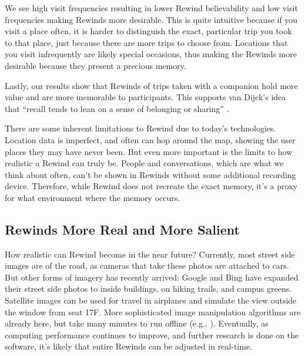 \documentclass{sigchi}
\begin{document}
We see high visit frequencies resulting in lower Rewind believability and low visit frequencies making Rewinds more desirable. This is quite intuitive because if you visit a place often, it is harder to distinguish the exact, particular trip you took to that place, just because there are more trips to choose from. Locations that you visit infrequently are likely special occasions, thus making the Rewinds more desirable because they present a precious memory.

Lastly, our results show that Rewinds of trips taken with a companion hold more value and are more memorable to participants. This supports van Dijck's idea that ``recall tends to lean on a sense of belonging or sharing'' \cite{van2007mediated}.

		

There are some inherent limitations to Rewind due to today's technologies. Location data is imperfect, and often can hop around the map, showing the user places they may have never been. But even more important is the limits to how realistic a Rewind can truly be. People and conversations, which are what we think about often, can't be shown in Rewinds without some additional recording device. Therefore, while Rewind does not recreate the exact memory, it's a proxy for what environment where the memory occurs.

\subsection{Rewinds More Real and More Salient}

How realistic can Rewind become in the near future? Currently, most street side images are of the road, as cameras that take these photos are attached to cars. But other forms of imagery has recently arrived: Google and Bing have expanded their street side photos to inside buildings, on hiking trails, and campus greens. Satellite images can be used for travel in airplanes and simulate the view outside the window from seat 17F. More sophisticated image manipulation algorithms are already here, but take many minutes to run offline (e.g., \cite{laffont2014transient,shih2013data}). Eventually, as computing performance continues to improve, and further research is done on the software, it's likely that entire Rewinds can be adjusted in real-time.
\end{document}
